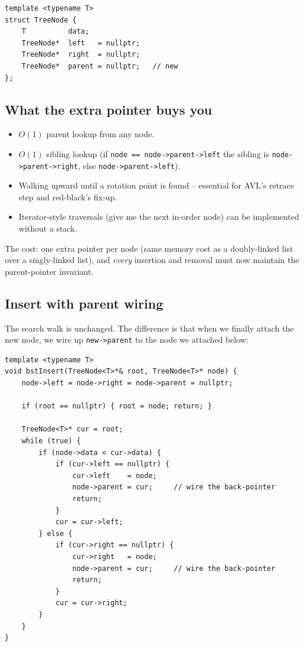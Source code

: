 \documentclass[11pt]{article}
\begin{document}
\begin{lstlisting}
template <typename T>
struct TreeNode {
    T          data;
    TreeNode*  left   = nullptr;
    TreeNode*  right  = nullptr;
    TreeNode*  parent = nullptr;   // new
};
\end{lstlisting}

\subsection*{What the extra pointer buys you}

\begin{itemize}[leftmargin=*]
    \item $O(1)$ parent lookup from any node.
    \item $O(1)$ sibling lookup (if \texttt{node == node->parent->left} the sibling is \texttt{node->parent->right}, else \texttt{node->parent->left}).
    \item Walking upward until a rotation point is found -- essential for AVL's retrace step and red-black's fix-up.
    \item Iterator-style traversals (give me the next in-order node) can be implemented without a stack.
\end{itemize}

The cost: one extra pointer per node (same memory cost as a doubly-linked list over a singly-linked list), and \emph{every} insertion and removal must now maintain the parent-pointer invariant.

\subsection*{Insert with parent wiring}

The search walk is unchanged. The difference is that when we finally attach the new node, we wire up \texttt{new->parent} to the node we attached below:

\begin{lstlisting}
template <typename T>
void bstInsert(TreeNode<T>*& root, TreeNode<T>* node) {
    node->left = node->right = node->parent = nullptr;

    if (root == nullptr) { root = node; return; }

    TreeNode<T>* cur = root;
    while (true) {
        if (node->data < cur->data) {
            if (cur->left == nullptr) {
                cur->left    = node;
                node->parent = cur;     // wire the back-pointer
                return;
            }
            cur = cur->left;
        } else {
            if (cur->right == nullptr) {
                cur->right   = node;
                node->parent = cur;     // wire the back-pointer
                return;
            }
            cur = cur->right;
        }
    }
}
\end{lstlisting}
\end{document}

